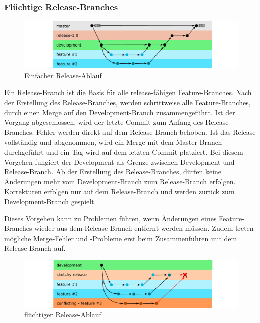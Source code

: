 \subsubsection{Flüchtige Release-Branches}
\label{temporary-releases}

\begin{figure}[htbp]
  \includegraphics[width=\textwidth, height=\textheight, keepaspectratio]
  {resources/simple-release.pdf}
  \caption{Einfacher Release-Ablauf}
  \label{simple-release}
\end{figure}

Ein Release-Branch ist die Basis für alle release-fähigen Feature-Branches. Nach der Erstellung des Release-Branches, werden schrittweise alle Feature-Branches, durch einen Merge auf den Development-Branch zusammengeführt. Ist der Vorgang abgeschlossen, wird der letzte Commit zum Anfang des Release-Branches. Fehler werden direkt auf dem Release-Branch behoben. Ist das Release vollständig und abgenommen, wird ein Merge mit dem Master-Branch durchgeführt und ein Tag wird auf dem letzten Commit platziert. Bei diesem Vorgehen fungiert der Development als Grenze zwischen Development und Release-Branch. Ab der Erstellung des Release-Branches, dürfen keine Änderungen mehr vom Development-Branch zum Release-Branch erfolgen. Korrekturen erfolgen nur auf dem Release-Branch und werden zurück zum Development-Branch gespielt.

Dieses Vorgehen kann zu Problemen führen, wenn Änderungen eines Feature-Branches wieder aus dem Release-Branch entfernt werden müssen. Zudem treten mögliche Merge\hyp{}Fehler und \hyp{}Probleme erst beim Zusammenführen mit dem Release-Branch auf.

\begin{figure}[htbp]
  \includegraphics[width=\textwidth, height=\textheight, keepaspectratio]
  {resources/sketchy-release.pdf}
  \caption{flüchtiger Release-Ablauf}
  \label{sketchy-release}
\end{figure}

